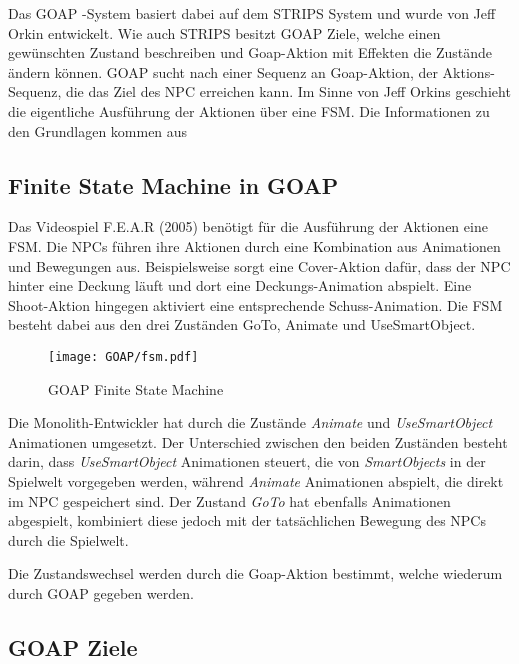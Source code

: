 Das GOAP -System basiert dabei auf dem STRIPS System und wurde von Jeff Orkin entwickelt. Wie auch STRIPS besitzt GOAP Ziele, welche einen gew\"{u}nschten Zustand beschreiben und Goap-Aktion mit Effekten die Zust\"{a}nde \"{a}ndern k\"{o}nnen. GOAP sucht nach einer Sequenz an Goap-Aktion, der Aktions-Sequenz, die das Ziel des NPC erreichen kann. Im Sinne von Jeff Orkins geschieht die eigentliche Ausf\"{u}hrung der Aktionen \"{u}ber eine FSM. Die Informationen zu den Grundlagen kommen aus \autocite{fear, fear2, fear3}


\subsection{Finite State Machine in GOAP}
\label{chap:fsm goap}

Das Videospiel F.E.A.R (2005) ben\"{o}tigt f\"{u}r die Ausf\"{u}hrung der Aktionen eine FSM. Die NPCs f\"{u}hren ihre Aktionen durch eine Kombination aus Animationen und Bewegungen aus. Beispielsweise sorgt eine Cover-Aktion daf\"{u}r, dass der NPC hinter eine Deckung l\"{a}uft und dort eine Deckungs-Animation abspielt. Eine Shoot-Aktion hingegen aktiviert eine entsprechende Schuss-Animation. Die FSM besteht dabei aus den drei Zust\"{a}nden GoTo, Animate und UseSmartObject. 
\begin{figure}[h]
  \centering
  \texttt{[image: GOAP/fsm.pdf]}
	\captionsetup{justification=justified, format=plain}
  \caption{GOAP Finite State Machine}
  \label{fig:Goap FSM}
\end{figure}

Die Monolith-Entwickler hat durch die Zust\"{a}nde \textit{Animate} und \textit{UseSmartObject} Animationen umgesetzt. Der Unterschied zwischen den beiden Zust\"{a}nden besteht darin, dass \textit{UseSmartObject} Animationen steuert, die von \textit{SmartObjects} in der Spielwelt vorgegeben werden, w\"{a}hrend \textit{Animate} Animationen abspielt, die direkt im NPC gespeichert sind. Der Zustand \textit{GoTo} hat ebenfalls Animationen abgespielt, kombiniert diese jedoch mit der tats\"{a}chlichen Bewegung des NPCs durch die Spielwelt.

Die Zustandswechsel werden durch die Goap-Aktion bestimmt, welche wiederum durch GOAP gegeben werden.


\subsection{GOAP Ziele}
\label{chap:goap ziele}

